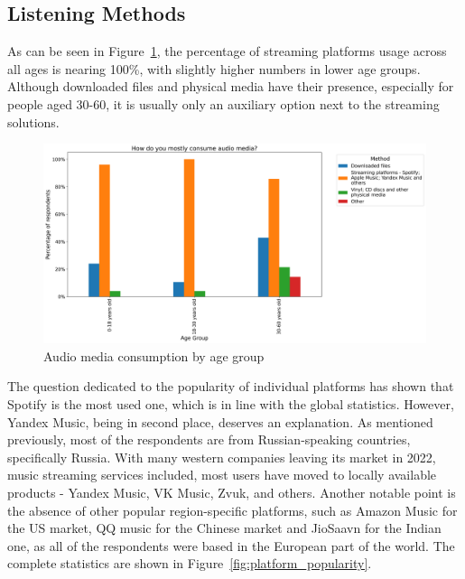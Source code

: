 \subsection{Listening Methods}
As can be seen in Figure~\ref{fig:consumption_methods}, the percentage of streaming platforms
usage across all ages is nearing 100\%, with slightly higher numbers in lower age groups.
Although downloaded files and physical media have their presence,
especially for people aged 30-60, it is usually only an auxiliary option next to the streaming solutions.

\begin{figure}[htbp]
    \centering
    \includegraphics[height=0.4\textheight]{charts/constumption_method.png}
    \caption{Audio media consumption by age group}
    \label{fig:consumption_methods}
\end{figure}

The question dedicated to the popularity of individual platforms has shown that Spotify is the most used one,
which is in line with the global statistics\cite{spotifypopularity}.
However, Yandex Music, being in second place, deserves an explanation.
As mentioned previously, most of the respondents are from Russian-speaking countries, specifically Russia.
With many western companies leaving its market in 2022, music streaming services included, most users have
moved to locally available products - Yandex Music, VK Music, Zvuk, and others.
Another notable point is the absence of other popular region-specific platforms, such as Amazon Music for the US market,
QQ music for the Chinese market and JioSaavn for the Indian one,
as all of the respondents were based in the European part of the world.
The complete statistics are shown in Figure~\ref{fig:platform_popularity}.

